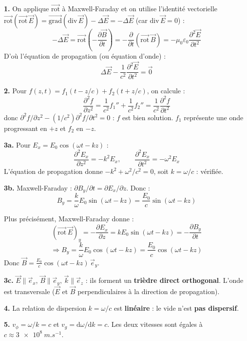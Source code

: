 \documentclass[12pt,a4paper]{article}
\begin{document}
\begin{boitecorrige}
\textbf{1.} On applique $\overrightarrow{\mathrm{rot}}$ à Maxwell-Faraday et on utilise l'identité vectorielle $\overrightarrow{\mathrm{rot}}(\overrightarrow{\mathrm{rot}}\,\vec{E}) = \overrightarrow{\mathrm{grad}}(\mathrm{div}\,\vec{E}) - \Delta\vec{E} = -\Delta\vec{E}$ (car $\mathrm{div}\,\vec{E}=0$) :
\[
-\Delta\vec{E} = \overrightarrow{\mathrm{rot}}\!\left(-\frac{\partial\vec{B}}{\partial t}\right) = -\frac{\partial}{\partial t}(\overrightarrow{\mathrm{rot}}\,\vec{B}) = -\mu_0\varepsilon_0\frac{\partial^2\vec{E}}{\partial t^2}
\]
D'où l'équation de propagation (ou équation d'onde) :
\[
\boxed{\Delta\vec{E} - \frac{1}{c^2}\frac{\partial^2\vec{E}}{\partial t^2} = \vec{0}}
\]

\textbf{2.} Pour $f(z,t) = f_1(t-z/c)+f_2(t+z/c)$, on calcule :
\[
\frac{\partial^2 f}{\partial z^2} = \frac{1}{c^2}f_1'' + \frac{1}{c^2}f_2'' = \frac{1}{c^2}\frac{\partial^2 f}{\partial t^2}
\]
donc $\partial^2 f/\partial z^2 - (1/c^2)\partial^2 f/\partial t^2 = 0$ : $f$ est bien solution. $f_1$ représente une onde progressant en $+z$ et $f_2$ en $-z$.

\textbf{3a.} Pour $E_x = E_0\cos(\omega t - kz)$ :
\[
\frac{\partial^2 E_x}{\partial z^2} = -k^2 E_x, \qquad \frac{\partial^2 E_x}{\partial t^2} = -\omega^2 E_x
\]
L'équation de propagation donne $-k^2 + \omega^2/c^2 = 0$, soit $k = \omega/c$ : vérifiée.

\textbf{3b.} Maxwell-Faraday : $\partial B_y/\partial t = \partial E_x/\partial z$. Donc :
\[
B_y = \frac{k}{\omega}E_0\sin(\omega t-kz) = \frac{E_0}{c}\sin(\omega t-kz)
\]

Plus précisément, Maxwell-Faraday donne :
\[
(\overrightarrow{\mathrm{rot}}\,\vec{E})_y = -\frac{\partial E_x}{\partial z} = kE_0\sin(\omega t-kz) = -\frac{\partial B_y}{\partial t}
\]
\[
\Rightarrow B_y = \frac{k}{\omega}E_0\cos(\omega t-kz) = \frac{E_0}{c}\cos(\omega t-kz)
\]
Donc $\vec{B} = \frac{E_0}{c}\cos(\omega t-kz)\,\vec{e}_y$.

\textbf{3c.} $\vec{E}\parallel\vec{e}_x$, $\vec{B}\parallel\vec{e}_y$, $\vec{k}\parallel\vec{e}_z$ : ils forment un \textbf{trièdre direct orthogonal}. L'onde est transversale ($\vec{E}$ et $\vec{B}$ perpendiculaires à la direction de propagation).

\textbf{4.} La relation de dispersion $k = \omega/c$ est \textbf{linéaire} : le vide n'est \textbf{pas dispersif}.

\textbf{5.} $v_\phi = \omega/k = c$ et $v_g = \mathrm{d}\omega/\mathrm{d}k = c$. Les deux vitesses sont égales à $c \approx \qty{3e8}{m.s^{-1}}$.
\end{boitecorrige}
\end{document}
